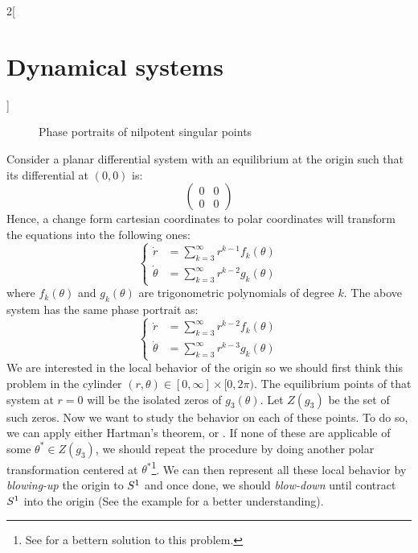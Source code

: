 \documentclass[../../../main_math.tex]{subfiles}
\begin{document}
\begin{multicols}{2}[\section{Dynamical systems}]
\begin{theorem}
\begin{figure}[H]
      \begin{subfigure}[b]{0.3\linewidth}
        \centering
        
        \caption{}
        \label{DS:nilpot-m}
      \end{subfigure}
      \caption{Phase portraits of nilpotent singular points}
    \end{figure}
  \end{theorem}
  \begin{theorem}\label{DS:blowpolar}
    Consider a planar differential system with an equilibrium at the origin such that its differential at $(0,0)$ is:
    $$\begin{pmatrix}
        0 & 0 \\
        0 & 0
      \end{pmatrix}$$
    Hence, a change form cartesian coordinates to polar coordinates will transform the equations into the following ones:
    $$
      \left\{
      \begin{aligned}
        \dot{r}      & = \sum_{k=3}^\infty r^{k-1}f_{k}(\theta) \\
        \dot{\theta} & = \sum_{k=3}^\infty r^{k-2}g_{k}(\theta)
      \end{aligned}
      \right.
    $$
    where $f_k(\theta)$ and $g_k(\theta)$ are trigonometric polynomials of degree $k$. The above system has the same phase portrait as:
    $$
      \left\{
      \begin{aligned}
        \dot{r}      & = \sum_{k=3}^\infty r^{k-2}f_{k}(\theta) \\
        \dot{\theta} & = \sum_{k=3}^\infty r^{k-3}g_{k}(\theta)
      \end{aligned}
      \right.
    $$
    We are interested in the local behavior of the origin so we should first think this problem in the cylinder $(r,\theta)\in[0,\infty]\times[0,2\pi)$. The equilibrium points of that system at $r=0$ will be the isolated zeros of $g_3(\theta)$. Let $Z(g_3)$ be the set of such zeros. Now we want to study the behavior on each of these points. To do so, we can apply either Hartman's theorem,  or . If none of these are applicable of some $\theta^*\in Z(g_3)$, we should repeat the procedure by doing another polar transformation centered at $\theta^*$\footnote{See  for a bettern solution to this problem.}. We can then represent all these local behavior by \emph{blowing-up} the origin to $\S^1$ and once done, we should \emph{blow-down} until contract $\S^1$ into the origin (See the example  for a better understanding).

\end{theorem}
\end{multicols}
\end{document}
